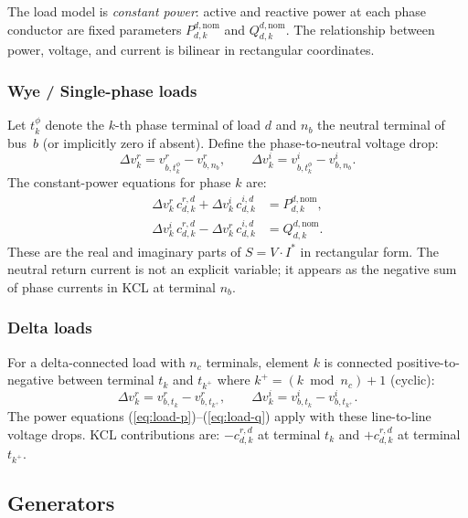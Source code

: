 \documentclass[11pt,a4paper]{article}
\newcommand{\vr}[2]{v^r_{#1,#2}}
\newcommand{\vi}[2]{v^i_{#1,#2}}
\newcommand{\dvr}{\Delta v^r}
\newcommand{\dvi}{\Delta v^i}
\begin{document}
The load model is \emph{constant power}: active and reactive power at each
phase conductor are fixed parameters $P^{d,\text{nom}}_{d,k}$ and
$Q^{d,\text{nom}}_{d,k}$.  The relationship between power, voltage, and current
is bilinear in rectangular coordinates.

\subsubsection*{Wye / Single-phase loads}

Let $t^\phi_k$ denote the $k$-th phase terminal of load $d$ and $n_b$ the
neutral terminal of bus~$b$ (or implicitly zero if absent).  Define the
phase-to-neutral voltage drop:
%
\begin{equation}
  \dvr_k = \vr{b}{t^\phi_k} - \vr{b}{n_b},
  \qquad
  \dvi_k = \vi{b}{t^\phi_k} - \vi{b}{n_b}.
\end{equation}
%
The constant-power equations for phase $k$ are:
%
\begin{align}
  \dvr_k\,c^{r,d}_{d,k} + \dvi_k\,c^{i,d}_{d,k} &= P^{d,\text{nom}}_{d,k},
  \label{eq:load-p}\\
  \dvi_k\,c^{r,d}_{d,k} - \dvr_k\,c^{i,d}_{d,k} &= Q^{d,\text{nom}}_{d,k}.
  \label{eq:load-q}
\end{align}
%
These are the real and imaginary parts of $S = V \cdot I^*$ in rectangular form.
The neutral return current is not an explicit variable; it appears as the
negative sum of phase currents in KCL at terminal $n_b$.

\subsubsection*{Delta loads}

For a delta-connected load with $n_c$ terminals, element $k$ is connected
positive-to-negative between terminal $t_k$ and $t_{k^+}$ where
$k^+ = (k \bmod n_c) + 1$ (cyclic):
%
\begin{equation}
  \dvr_k = \vr{b}{t_k} - \vr{b}{t_{k^+}},
  \qquad
  \dvi_k = \vi{b}{t_k} - \vi{b}{t_{k^+}}.
\end{equation}
%
The power equations (\ref{eq:load-p})--(\ref{eq:load-q}) apply with these
line-to-line voltage drops.  KCL contributions are: $-c^{r,d}_{d,k}$ at
terminal $t_k$ and $+c^{r,d}_{d,k}$ at terminal $t_{k^+}$.

\subsection{Generators}
\label{sec:generators}
\end{document}
